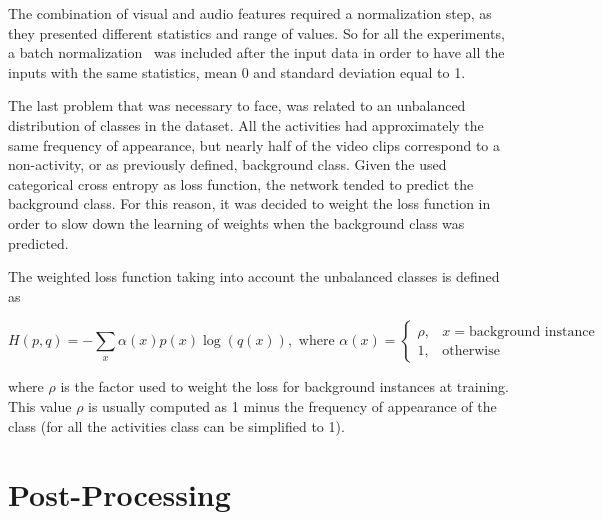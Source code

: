 The combination of visual and audio features required a normalization step, as they presented different statistics and range of values.
So for all the experiments, a batch normalization~\cite{ioffe2015batch} was included after the input data in order to have all the inputs with the same statistics, mean 0 and standard deviation equal to 1.

The last problem that was necessary to face, was related to an unbalanced distribution of classes in the dataset. All the activities had approximately the same frequency of appearance, but nearly half of the video clips correspond to a non-activity, or as previously defined, background class.
Given the used categorical cross entropy as loss function, the network tended to predict the background class. For this reason, it was decided to weight the loss function in order to slow down the learning of weights when the background class was predicted. %

The weighted loss function taking into account the unbalanced classes is defined as

\begin{equation}
	H(p,q) = - \sum_x \alpha(x) p(x) \log (q(x)), \text{ where } \alpha(x) =
    \begin{cases}
        \rho, & x = \text{background instance}\\
        1,    & \text{otherwise}
    \end{cases}
\end{equation}

where $\rho$ is the factor used to weight the loss for background instances at training. This value $\rho$ is usually computed as 1 minus the frequency of appearance of the class (for all the activities class can be simplified to 1). %

\section{Post-Processing}
\label{section:post_processing}

